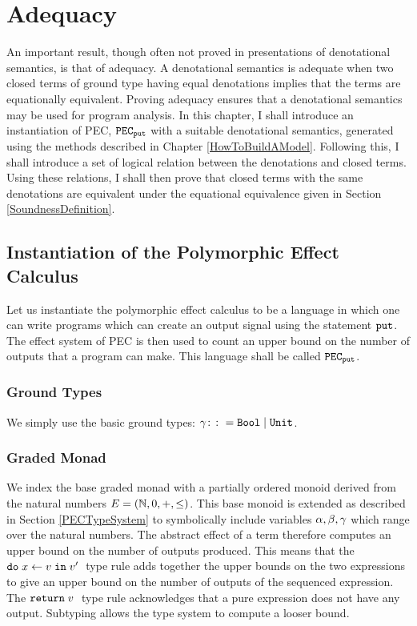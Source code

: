 \chapter{Adequacy}
    An important result, though often not proved in presentations of denotational semantics, is that of adequacy. A denotational semantics is adequate when two closed terms of ground type having equal denotations implies that the terms are equationally equivalent. Proving adequacy ensures that a denotational semantics may be used for program analysis. In this chapter, I shall introduce an instantiation of PEC,  $\texttt{PEC}_{\texttt{put}}$ with a suitable denotational semantics, generated using the methods described in Chapter \ref{HowToBuildAModel}. Following this, I shall introduce a set of logical relation between the denotations and closed terms. Using these relations, I shall then prove that closed terms with the same denotations are equivalent under the equational equivalence given in Section \ref{SoundnessDefinition}.

    \section{Instantiation of the Polymorphic Effect Calculus}
    Let us instantiate the polymorphic effect calculus to be a language in which one can write programs which can create an output signal using the statement $\texttt{put}$. The effect system of PEC is then used to count an upper bound on the number of outputs that a program can make. This language shall be called $\texttt{PEC}_{\texttt{put}}$.

    \subsection{Ground Types}
    We simply use the basic ground types: $\gamma \colon\colon= \texttt{Bool} \mid \texttt{Unit}$.

    \subsection{Graded Monad}
    We index the base graded monad with a partially ordered monoid derived from the natural numbers $E = (\mathbb{N}, 0, +, \leq)$. This base monoid is extended as described in Section \ref{PECTypeSystem} to symbolically include variables $\alpha, \beta, \gamma$ which range over the natural numbers. The abstract effect of a term therefore computes an upper bound on the number of outputs produced.  This means that the $\texttt{do}\; x \leftarrow v \;\texttt{in}\; v'\;$ type rule adds together the upper bounds on the two expressions to give an upper bound on the number of outputs of the sequenced expression. The $\texttt{return} \; v\;$ type rule acknowledges that a pure expression does not have any output. Subtyping  allows the type system to compute a looser bound.
    
